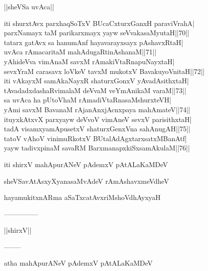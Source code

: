 \documentclass{article}
\begin{document}
\begin{center}
||sheVSa uvAca||
\end{center}

iti shurxtAvx parxhaqSoTxV BUcaCxturxGanxH paraviVrahA|\\
parxNamayx taM parikarxmayx yayw seVvakasaMyutaH||70||\\
tatarx gatAvx sa hanumAnf hayavarayxsayx pAshavxRtaH|\\
uvAca rAmacaritaM mahAdugaRtinAshanaM||71||\\
yAhideVva vimAnaM savxM rAmakiVtaRnapuNayxtaH|\\
sevxYraM carasavx loVkeV tavxM mukotxV BavakuyoVnitaH||72||\\
iti vAkayxM samAkaNayxR shaturxGonxV yAvadAsithxtaH|\\
tAvadadxdashaRvimalaM deVvaM veYmAnikaM varaM||73||\\
sa uvAca ha pUtoVhaM rAmadiVtaRnasaMshurxteVH|\\
yAmi savxM BavanaM rAjanAnxjAcnxpaya mahAmateV||74||\\
ituyxkAtxvX parxyayw deVvoV vimAneV sevxV parisithxtaH|\\
tadA visamxyamApusetxV shaturxGenxVna sahAnugAH||75||\\
tatoV vAhoV vinimuRkotxV BUtalAdAgxtarxsatxMBanAtf|\\
yayw tadivxpinaM savaRM BarxmanapxkiSxsamAkulaM||76||\\

\begin{center}
iti shirxV mahApurANeV pAdemxV pAtALaKaMDeV
\end{center}

\begin{center}
sheVSavAtAsxyXyanasaMvAdeV rAmAshavxmeVdheV
\end{center}

\begin{center}
hayamukitxnARma aSaTxcatAvxriMshoVdhAyxyaH
\end{center}

\begin{center}
---------------
\end{center}

\begin{center}
||shirxV||
\end{center}

\begin{center}
--------
\end{center}

\begin{center}
atha mahApurANeV pAdemxV pAtALaKaMDeV
\end{center}
\end{document}
